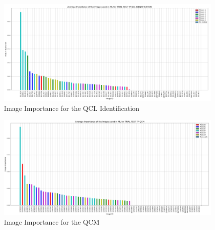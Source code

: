 \documentclass[a4paper,11pt]{report}
\numberwithin{figure}{chapter} %
\begin{document}
      \begin{figure}[H]
      \centering
      \includegraphics[width=.99\linewidth]{plots/im_importance_TRIAL_TEST_TP_QCL_IDENTIFICATION_2018-04-29_14_28_06.png}
      \caption{Image Importance for the QCL Identification}
      \label{fig:im_white2}
      \end{figure}

      \begin{figure}[H]
      \centering
      \includegraphics[width=.99\linewidth]{plots/im_importance_TRIAL_TEST_TP_QCM_2018-04-29_14_34_19.png}
      \caption{Image Importance for the QCM}
      \label{fig:im_white3}
      \end{figure}
\end{document}
